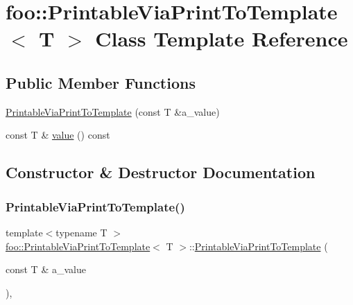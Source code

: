 \hypertarget{classfoo_1_1PrintableViaPrintToTemplate}{}\section{foo\+::Printable\+Via\+Print\+To\+Template$<$ T $>$ Class Template Reference}
\label{classfoo_1_1PrintableViaPrintToTemplate}
\subsection*{Public Member Functions}
\begin{DoxyCompactItemize}
\item 
\mbox{\hyperlink{classfoo_1_1PrintableViaPrintToTemplate_a8fef9e8b59c9415624230b73469b517e}{Printable\+Via\+Print\+To\+Template}} (const T \&a\+\_\+value)
\item 
const T \& \mbox{\hyperlink{classfoo_1_1PrintableViaPrintToTemplate_a14e0fcac9ae264e37e6212994b2920f6}{value}} () const
\end{DoxyCompactItemize}


\subsection{Constructor \& Destructor Documentation}
\mbox{\label{classfoo_1_1PrintableViaPrintToTemplate_a8fef9e8b59c9415624230b73469b517e}} 
\subsubsection{\texorpdfstring{PrintableViaPrintToTemplate()}{PrintableViaPrintToTemplate()}}
{\footnotesize\ttfamily template$<$typename T $>$ \\
\mbox{\hyperlink{classfoo_1_1PrintableViaPrintToTemplate}{foo\+::\+Printable\+Via\+Print\+To\+Template}}$<$ T $>$\+::\mbox{\hyperlink{classfoo_1_1PrintableViaPrintToTemplate}{Printable\+Via\+Print\+To\+Template}} (\begin{DoxyParamCaption}\item[{const T \&}]{a\+\_\+value }\end{DoxyParamCaption})\hspace{0.3cm}{\ttfamily [inline]}, {\ttfamily [explicit]}}



